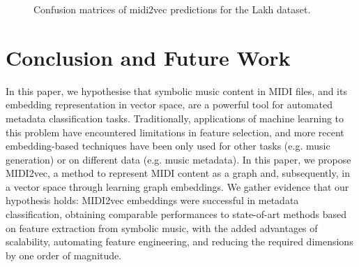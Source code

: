 \documentclass{article}
\begin{document}
\begin{figure}[ht!]
\centering
{}
\hfill
{}    
\caption{Confusion matrices of midi2vec predictions for the Lakh dataset.} \label{fig:cm-lakh}
\end{figure}

\section{Conclusion and Future Work}
\label{sec:conclusion}
In this paper, we hypothesise that symbolic music content in MIDI files, and its embedding representation in vector space, are a powerful tool for automated metadata classification tasks. Traditionally, applications of machine learning to this problem have encountered limitations in feature selection, and more recent embedding-based techniques have been only used for other tasks (e.g. music generation) or on different data (e.g. music metadata). In this paper, we propose MIDI2vec, a method to represent MIDI content as a graph and, subsequently, in a vector space through learning graph embeddings. We gather evidence that our hypothesis holds: MIDI2vec embeddings were successful in metadata classification, obtaining comparable performances to state-of-art methods based on feature extraction from symbolic music, with the added advantages of scalability, automating feature engineering, and reducing the required dimensions by one order of magnitude.
\end{document}
